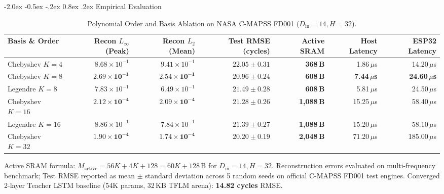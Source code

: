 \documentclass[10pt,twocolumn,a4paper]{article}
\makeatletter
\renewcommand\section{\@startsection{section}{1}{\z@}%
  {-2.0ex \@plus -0.5ex \@minus -.2ex}%
  {0.8ex \@plus .2ex}%
  {\normalfont\large\bfseries}}
\theoremstyle{plain}
\theoremstyle{definition}
\makeatother
\begin{document}
\section{Empirical Evaluation}

\begin{table}[t]
\centering
\caption{Polynomial Order and Basis Ablation on NASA C-MAPSS FD001 ($D_{\mathrm{in}}=14, H=32$).}
\label{tab:ablation}
\footnotesize
\begin{tabular*}{\textwidth}{@{\extracolsep{\fill}}lrrrrrr@{}}
\toprule
\textbf{Basis \& Order} & \textbf{Recon $L_\infty$ (Peak)} & \textbf{Recon $L_2$ (Mean)} & \textbf{Test RMSE (cycles)} & \textbf{Active SRAM} & \textbf{Host Latency} & \textbf{ESP32 Latency} \\
\midrule
Chebyshev $K=4$  & $8.68 \times 10^{-1}$            & $9.41 \times 10^{-1}$            & $22.05 \pm 0.31$            & \textbf{368\,B}   & 1.86\,$\mu$s           & 14.20\,$\mu$s \\
Chebyshev $K=8$  & $\mathbf{2.69 \times 10^{-1}}$   & $\mathbf{2.54 \times 10^{-1}}$   & $\mathbf{20.96 \pm 0.24}$   & \textbf{608\,B}   & \textbf{7.44\,$\mu$s}  & \textbf{24.60\,$\mu$s} \\
Legendre $K=8$   & $7.83 \times 10^{-1}$            & $6.49 \times 10^{-1}$            & $21.49 \pm 0.28$            & \textbf{608\,B}   & 5.81\,$\mu$s           & 24.50\,$\mu$s \\
Chebyshev $K=16$ & $\mathbf{2.12 \times 10^{-4}}$   & $\mathbf{2.09 \times 10^{-4}}$   & $21.28 \pm 0.26$            & \textbf{1,088\,B} & 15.25\,$\mu$s          & 58.40\,$\mu$s \\
Legendre $K=16$  & $8.86 \times 10^{-1}$            & $7.84 \times 10^{-1}$            & $21.39 \pm 0.27$            & \textbf{1,088\,B} & 15.20\,$\mu$s          & 58.10\,$\mu$s \\
Chebyshev $K=32$ & $\mathbf{1.90 \times 10^{-4}}$   & $\mathbf{1.74 \times 10^{-4}}$   & $\mathbf{20.20 \pm 0.19}$   & \textbf{2,048\,B} & 71.20\,$\mu$s          & 185.00\,$\mu$s \\
\bottomrule
\end{tabular*}
\begin{minipage}{\textwidth}
\vspace{3pt}
\scriptsize Active SRAM formula: $M_{\mathrm{active}} = 56K + 4K + 128 = 60K + 128$\,B for $D_{\mathrm{in}}=14, H=32$. Reconstruction errors evaluated on multi-frequency benchmark; Test RMSE reported as mean $\pm$ standard deviation across 5 random seeds on official C-MAPSS FD001 test engines. Converged 2-layer Teacher LSTM baseline (54K params, 32\,KB TFLM arena): \textbf{14.82 cycles} RMSE.
\end{minipage}
\end{table}
\end{document}
